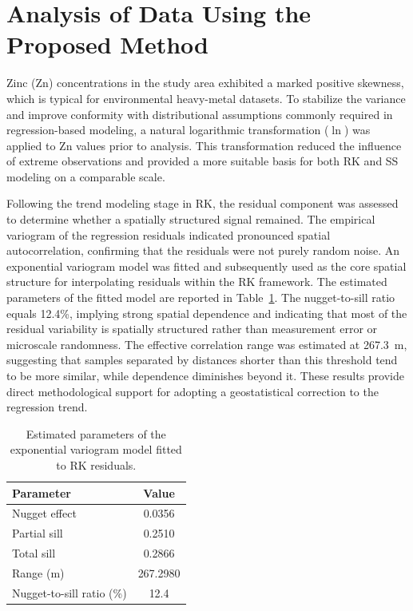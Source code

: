\documentclass[twoside]{article}
\begin{document}
\section{Analysis of Data Using the Proposed Method}
Zinc (Zn) concentrations in the study area exhibited a marked positive skewness, which is typical for environmental heavy-metal datasets. To stabilize the variance and improve conformity with distributional assumptions commonly required in regression-based modeling, a natural logarithmic transformation ($\ln$) was applied to Zn values prior to analysis. This transformation reduced the influence of extreme observations and provided a more suitable basis for both RK and SS modeling on a comparable scale.

Following the trend modeling stage in RK, the residual component was assessed to determine whether a spatially structured signal remained. The empirical variogram of the regression residuals indicated pronounced spatial autocorrelation, confirming that the residuals were not purely random noise. An exponential variogram model was fitted and subsequently used as the core spatial structure for interpolating residuals within the RK framework. The estimated parameters of the fitted model are reported in Table~\ref{tab:variogram_params}. The nugget-to-sill ratio equals 12.4\%, implying strong spatial dependence and indicating that most of the residual variability is spatially structured rather than measurement error or microscale randomness. The effective correlation range was estimated at 267.3~m, suggesting that samples separated by distances shorter than this threshold tend to be more similar, while dependence diminishes beyond it. These results provide direct methodological support for adopting a geostatistical correction to the regression trend.

\begin{table}[h]
\centering
\caption{Estimated parameters of the exponential variogram model fitted to RK residuals.}
\label{tab:variogram_params}
\begin{tabular}{lc}
\hline
\textbf{Parameter} & \textbf{Value} \\
\hline
Nugget effect & 0.0356 \\
Partial sill & 0.2510 \\
Total sill & 0.2866 \\
Range (m) & 267.2980 \\
Nugget-to-sill ratio (\%) & 12.4 \\
\hline
\end{tabular}
\end{table}
\end{document}
